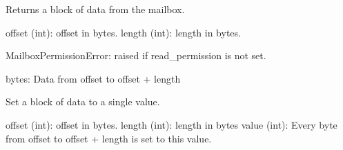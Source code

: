\documentclass[letterpaper,10pt,english]{sphinxmanual}
\begin{document}
\begin{fulllineitems}
\begin{fulllineitems}
\begin{description}
\end{description}

\end{fulllineitems}


\begin{fulllineitems}
\label{\detokenize{aliro_actuator.access_protocol.mailbox:aliro_actuator.access_protocol.mailbox.Mailbox.read}}
\pysigstartsignatures
{}
\pysigstopsignatures
\sphinxAtStartPar
Returns a block of data from the mailbox.
\begin{description}
\sphinxAtStartPar
offset (int): offset in bytes.
length (int): length in bytes.

\sphinxAtStartPar
MailboxPermissionError: raised if read\_permission is not set.

\sphinxAtStartPar
bytes: Data from offset to offset + length

\end{description}

\end{fulllineitems}


\begin{fulllineitems}
\label{\detokenize{aliro_actuator.access_protocol.mailbox:aliro_actuator.access_protocol.mailbox.Mailbox.set}}
\pysigstartsignatures
{}
\pysigstopsignatures
\sphinxAtStartPar
Set a block of data to a single value.
\begin{description}
\sphinxAtStartPar
offset (int): offset in bytes.
length (int): length in bytes
value (int): Every byte from offset to offset + length is set to this value.


\end{description}
\end{fulllineitems}
\end{fulllineitems}
\end{document}
